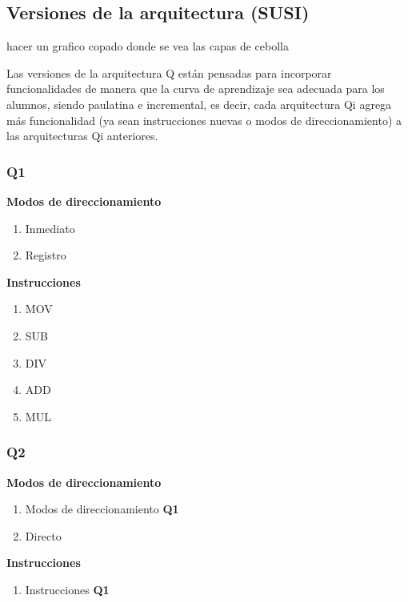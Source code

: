 \subsection{Versiones de la arquitectura (SUSI)}
hacer un grafico copado donde se vea las capas de cebolla

Las versiones de la arquitectura Q están pensadas para incorporar funcionalidades de manera que la curva de aprendizaje sea adecuada para los alumnos, siendo paulatina e incremental, es decir, cada arquitectura Qi agrega más funcionalidad (ya sean instrucciones nuevas o modos de direccionamiento) a las arquitecturas Qi anteriores.


\subsubsection{Q1}


\textbf{Modos de direccionamiento}
\begin{enumerate}
\item Inmediato
\item Registro
\end{enumerate}

\textbf{Instrucciones}
\begin{enumerate}
\item MOV
\item SUB 
\item DIV 
\item ADD 
\item MUL
\end{enumerate}


\subsubsection{Q2}

\textbf{Modos de direccionamiento}
\begin{enumerate}
\item Modos de direccionamiento \textbf{Q1}
\item Directo 
\end{enumerate}

\textbf{Instrucciones}
\begin{enumerate}
\item Instrucciones \textbf{Q1}
\end{enumerate}

